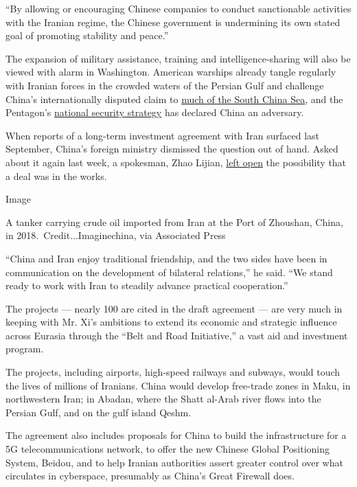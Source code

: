``By allowing or encouraging Chinese companies to conduct sanctionable
activities with the Iranian regime, the Chinese government is
undermining its own stated goal of promoting stability and peace.''

The expansion of military assistance, training and intelligence-sharing
will also be viewed with alarm in Washington. American warships already
tangle regularly with Iranian forces in the crowded waters of the
Persian Gulf and challenge China's internationally disputed claim to
\href{https://www.nytimes.com/2020/07/04/us/politics/south-china-sea-aircraft-carrier.html}{much
of the South China Sea}, and the Pentagon's
\href{https://www.nytimes.com/2018/01/19/us/politics/military-china-russia-terrorism-focus.html}{national
security strategy} has declared China an adversary.

When reports of a long-term investment agreement with Iran surfaced last
September, China's foreign ministry dismissed the question out of hand.
Asked about it again last week, a spokesman, Zhao Lijian,
\href{https://www.fmprc.gov.cn/mfa_eng/xwfw_665399/s2510_665401/2511_665403/t1795337.shtml}{left
open} the possibility that a deal was in the works.

Image

A tanker carrying crude oil imported from Iran at the Port of Zhoushan,
China, in 2018.~Credit...Imaginechina, via Associated Press

``China and Iran enjoy traditional friendship, and the two sides have
been in communication on the development of bilateral relations,'' he
said. ``We stand ready to work with Iran to steadily advance practical
cooperation.''

The projects --- nearly 100 are cited in the draft agreement --- are
very much in keeping with Mr. Xi's ambitions to extend its economic and
strategic influence across Eurasia through the ``Belt and Road
Initiative,'' a vast aid and investment program.

The projects, including airports, high-speed railways and subways, would
touch the lives of millions of Iranians. China would develop free-trade
zones in Maku, in northwestern Iran; in Abadan, where the Shatt al-Arab
river flows into the Persian Gulf, and on the gulf island Qeshm.

The agreement also includes proposals for China to build the
infrastructure for a 5G telecommunications network, to offer the new
Chinese Global Positioning System, Beidou, and to help Iranian
authorities assert greater control over what circulates in cyberspace,
presumably as China's Great Firewall does.

